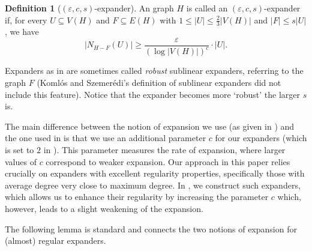 \documentclass[10pt]{article}
\theoremstyle{plain}
\numberwithin{theorem}{section}
\theoremstyle{definition}
\newtheorem{defn}[theorem]{Definition}
\theoremstyle{remark}
\newcommand{\eps}{\varepsilon}
\theoremstyle{plain}
\begin{document}
\begin{defn}[$(\eps, c, s)$-expander]
\label{defn:robust-sublinear-expansion} 
	An graph $H$ is called an $(\eps, c, s)$-expander if, for every $U\subseteq V(H)$ and $F\subseteq E(H)$ with $1\le |U|\leq \frac23 |V(H)|$ and $|F|\leq s|U|$, we have
	\begin{equation}
		|N_{H-F}(U)|\geq \frac{\eps}{(\log |V(H)|)^c} \cdot |U|.\label{eqn:expands}
	\end{equation}
\end{defn}

Expanders as in  are sometimes called \emph{robust} sublinear expanders, referring to the graph $F$ (Koml\'os and Szemer\'edi's definition of sublinear expanders did not include this feature). Notice that the expander becomes more `robust' the larger $s$ is.

The main difference between the notion of expansion we use (as given in ) and  the one used in \cite{bucic2022erdos} is that we use an additional parameter $c$ for our expanders (which is set to $2$ in \cite{bucic2022erdos}). This parameter measures the rate of expansion, where larger values of 
$c$ correspond to weaker expansion. Our approach in this paper relies crucially on expanders with excellent regularity properties, specifically those with average degree very close to maximum degree. In , we construct such expanders, which allows us to enhance their regularity by increasing the parameter $c$ which, however, leads to a slight weakening of the expansion. 

The following lemma is standard and connects the two notions of expansion for (almost) regular expanders.
\end{document}
